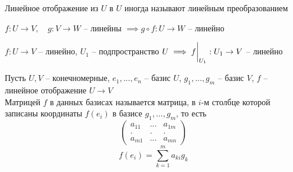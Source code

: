 \begin{remark}
	Линейное отображение из $U$ в $U$ иногда называют линейным преобразованием
\end{remark}

\begin{props}
	\item $ f : U \to V, \quad g : V \to W $ -- линейны $ \implies g \circ f : U \to W $ -- линейно
    \item $ f : U \to V $ -- линейно, $ U_1 $ -- подпространство $ U \implies f \bigg|_{U_1}^{} : U_1 \to V $ -- линейно
\end{props}

\begin{definition}
	Пусть $ U, V $ -- конечномерные, $ e_1, ..., e_n $ -- базис $ U $, $ g_1, ..., g_m $ -- базис $ V $, $ f $ -- линейное отображение $ U \to V $ \\
    Матрицей $ f $ в данных базисах называется матрица, в $ i $-м столбце которой записаны координаты $ f(e_i) $ в базисе $ g_1, ..., g_m $, то есть
    $$
    \begin{pmatrix}
        a_11 & ... & a_{1m} \\
        . & . & . \\
        a_{m1} & ... & a_{mn}
    \end{pmatrix} $$
    $$ f(e_i) = \sum_{k = 1}^{m} a_{ki}g_k $$
\end{definition}

